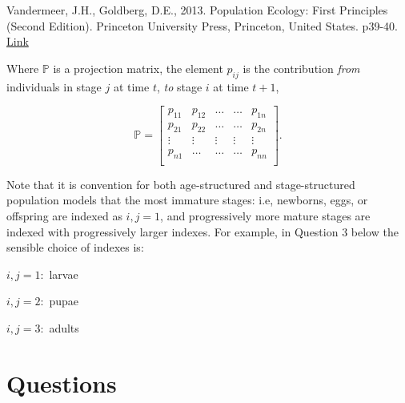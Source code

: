 \documentclass[]{book}
\begin{document}
Vandermeer, J.H., Goldberg, D.E., 2013. Population Ecology: First
Principles (Second Edition). Princeton University Press, Princeton,
United States. p39-40.
\href{https://ebookcentral-proquest-com.qe2a-proxy.mun.ca/lib/mun/detail.action?docID=1205619}{Link}

Where \(\mathbb{P}\) is a projection matrix, the element \(p_{ij}\) is
the contribution \emph{from} individuals in stage \(j\) at time \(t\),
\emph{to} stage \(i\) at time \(t+1\),

\begin{equation}
\mathbb{P} = 
\left[
\begin{array}{ccccc}
p_{11} & p_{12} & \dots & \dots & p_{1n} \\
p_{21} & p_{22} & \dots & \dots & p_{2n} \\
\vdots & \vdots & \vdots & \vdots & \vdots \\
p_{n1} & \dots & \dots & \dots & p_{nn} \\
\end{array}
\right].
\end{equation}

Note that it is convention for both age-structured and stage-structured
population models that the most immature stages: i.e, newborns, eggs, or
offspring are indexed as \(i,j = 1\), and progressively more mature
stages are indexed with progressively larger indexes. For example, in
Question 3 below the sensible choice of indexes is:

\(i,j = 1:\) larvae

\(i,j = 2:\) pupae

\(i,j = 3:\) adults

\section{Questions}\label{questions}
\end{document}
